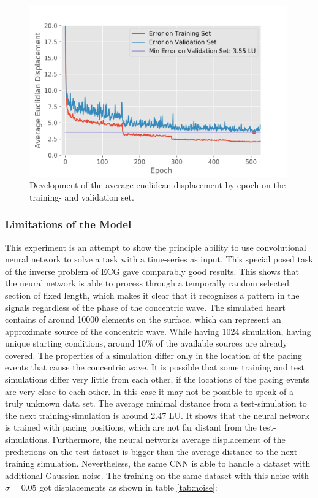 \begin{figure}[ht]
    \center
    \includegraphics[width=0.99\textwidth]{figures/reg_plot1.png}
	\caption{Development of the average euclidean displacement by epoch on the training- and validation set.}
	\fontsize{3}{2}
	\label{fig:autoencoder_architecture}
\end{figure}

\subsubsection{Limitations of the Model}
This experiment is an attempt to show the principle ability to use convolutional neural network to solve a task with a time-series as input. This special posed task of the inverse problem of ECG gave comparably good results. This shows that the neural network is able to process through a temporally random selected section of fixed length, which makes it clear that it recognizes a pattern in the signals regardless of the phase of the concentric wave. The simulated heart contains of around 10000 elements on the surface, which can represent an approximate source of the concentric wave. While having 1024 simulation, having unique starting conditions, around 10\% of the available sources are already covered.  The properties of a simulation differ only in the location of the pacing events that cause the concentric wave. It is possible that some training and test simulations differ very little from each other, if the locations of the pacing events are very close to each other. In this case it may not be possible to speak of a truly unknown data set. The average minimal distance from a test-simulation to the next training-simulation is around 2.47 LU. It shows that the neural network is trained with pacing positions, which are not far distant from the test-simulations. Furthermore, the neural networks average displacement of the predictions on the test-dataset is bigger than the average distance to the next training simulation. Nevertheless, the same CNN is able to handle a dataset with additional Gaussian noise. The training on the same dataset with this noise with $\sigma=0.05$ got displacements as shown in table \ref{tab:noise}:

